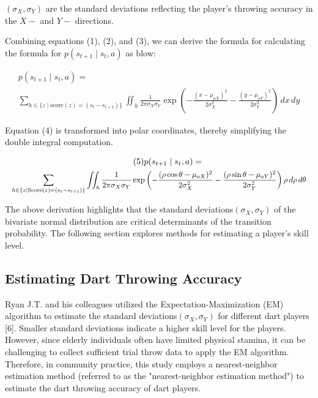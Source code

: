 \documentclass[cjjs]{ipart}
\theoremstyle{plain}
\begin{document}
$(\sigma_X, \sigma_Y)$ are the standard deviations reflecting the player's throwing accuracy in the $X-$ and $Y-$ directions. 

Combining equations (1), (2), and (3), we can derive the formula for calculating the formula for $p(s_{t+1} \mid s_t, a)$ as blow:

\begin{multline}
\tag{4}
p(s_{t+1} \mid s_t, a)=\\
\sum_{h \in \{ z \mid \text{score}(z) = (s_t - s_{t+1}) \}} \iint_h \frac{1}{2 \pi \sigma_X \sigma_Y} \exp \left( - \frac{(x - \mu_{aX})^2}{2 \sigma_X^2} - \frac{(y - \mu_{aY})^2}{2 \sigma_Y^2} \right) \, dx\,dy 
\end{multline}

Equation (4) is transformed into polar coordinates, thereby simplifying the double integral computation.

\begin{multline}
\tag{5}
p(s_{t+1} \mid s_t, a) =\\
\resizebox{\textwidth}{!}{$\displaystyle\sum_{h \in \{ z \mid \text{Score}(z) = (s_t - s_{t+1}) \}} \iint_h \frac{1}{2 \pi \sigma_X \sigma_Y} \exp \left( - \frac{(\rho \cos \theta - \mu_{aX})^2}{2 \sigma_X^2} - \frac{(\rho \sin \theta - \mu_{aY})^2}{2 \sigma_Y^2} \right) \rho \, d\rho \, d\theta$}
\end{multline}

The above derivation highlights that the standard deviations$(\sigma_X, \sigma_Y)$ of the bivariate normal distribution are critical determinants of the transition probability. The following section explores methods for estimating a player's skill level.

\subsection{Estimating Dart Throwing Accuracy}

Ryan J.T. and his colleagues utilized the Expectation-Maximization (EM) algorithm to estimate the standard deviations$(\sigma_X, \sigma_Y)$ for different dart players [6]. Smaller standard deviations indicate a higher skill level for the players. However, since elderly individuals often have limited physical stamina, it can be challenging to collect sufficient trial throw data to apply the EM algorithm. Therefore, in community practice, this study employs a nearest-neighbor estimation method (referred to as the "nearest-neighbor estimation method") to estimate the dart throwing accuracy of dart players.
\end{document}

